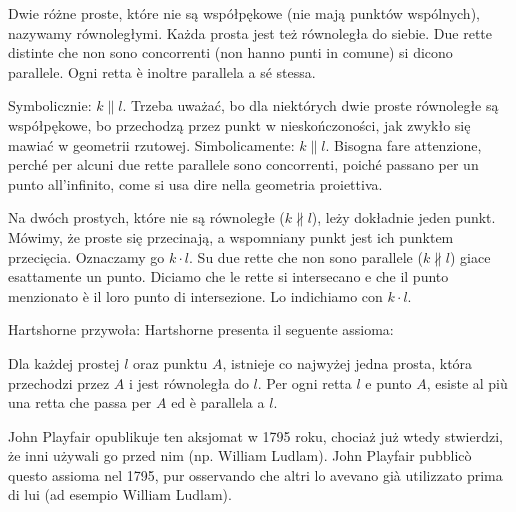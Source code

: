 \begin{definition}
    Dwie różne proste, które nie są współpękowe (nie mają punktów wspólnych), nazywamy równoległymi. %
    Każda prosta jest też równoległa do siebie. %
    Due rette distinte che non sono concorrenti (non hanno punti in comune) si dicono parallele. %
    Ogni retta è inoltre parallela a sé stessa. %
\end{definition}

Symbolicznie: $k \parallel l$. %
Trzeba uważać, bo dla niektórych dwie proste równoległe są współpękowe, bo przechodzą przez punkt w nieskończoności, jak zwykło się mawiać w geometrii rzutowej. %
Simbolicamente: $k \parallel l$. %
Bisogna fare attenzione, perché per alcuni due rette parallele sono concorrenti, poiché passano per un punto all'infinito, come si usa dire nella geometria proiettiva. %

Na dwóch prostych, które nie są równoległe ($k \nparallel l$), leży dokładnie jeden punkt. %
Mówimy, że proste się przecinają, a wspomniany punkt jest ich punktem przecięcia. %
Oznaczamy go $k \cdot l$. %
Su due rette che non sono parallele ($k \nparallel l$) giace esattamente un punto. %
Diciamo che le rette si intersecano e che il punto menzionato è il loro punto di intersezione. %
Lo indichiamo con $k \cdot l$. %

Hartshorne \cite[s. 38]{hartshorne_2000} przywoła: %
Hartshorne \cite[p. 38]{hartshorne_2000} presenta il seguente assioma: %

\begin{axiom}
[Playfaira, P] %
[di Playfair, P] %
    Dla każdej prostej $l$ oraz punktu $A$, istnieje co najwyżej jedna prosta, która przechodzi przez $A$ i jest równoległa do $l$. %
    Per ogni retta $l$ e punto $A$, esiste al più una retta che passa per $A$ ed è parallela a $l$. %
\end{axiom}

John Playfair opublikuje ten aksjomat w 1795 roku, chociaż już wtedy stwierdzi, że inni używali go przed nim (np. William Ludlam). %
John Playfair pubblicò questo assioma nel 1795, pur osservando che altri lo avevano già utilizzato prima di lui (ad esempio William Ludlam). %
%
%

